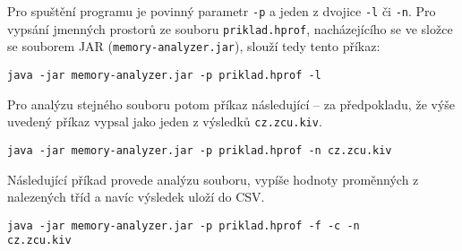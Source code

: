 Pro spuštění programu je povinný parametr \texttt{-p} a jeden z dvojice \texttt{-l} či \texttt{-n}. Pro vypsání jmenných prostorů ze souboru \texttt{priklad.hprof}, nacházejícího se ve složce se souborem JAR (\texttt{memory-analyzer.jar}), slouží tedy tento příkaz:

\begin{lstlisting}[frame={single}]
java -jar memory-analyzer.jar -p priklad.hprof -l
\end{lstlisting}

Pro analýzu stejného souboru potom příkaz následující -- za předpokladu, že výše uvedený příkaz vypsal jako jeden z výsledků \texttt{cz.zcu.kiv}.

\begin{lstlisting}[frame={single}]
java -jar memory-analyzer.jar -p priklad.hprof -n cz.zcu.kiv
\end{lstlisting}

Následující příkad provede analýzu souboru, vypíše hodnoty proměnných z nalezených tříd a navíc výsledek uloží do CSV.

\begin{lstlisting}[frame={single}]
java -jar memory-analyzer.jar -p priklad.hprof -f -c -n 
cz.zcu.kiv
\end{lstlisting}